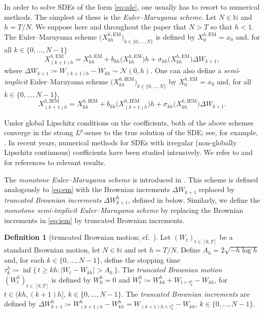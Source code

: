 \documentclass[onseside, final]{amsart}
\theoremstyle{definition}
\newtheorem{definition}[theorem]{Definition}
\newcommand{\N}{\mathbb N}
\newcommand{\EM}{\mathrm{EM}}
\newcommand{\IEM}{\mathrm{IEM}}
\numberwithin{equation}{section}
\begin{document}
			In order to solve SDEs of the form \eqref{eq:sde}, one usually has to resort to numerical methods. The simplest of these is the \emph{Euler--Maruyama scheme}. Let $N \in \N$ and $h = T/N$. We suppose here and throughout the paper that $N > T$ so that $h < 1$. The Euler--Maruyama scheme $\bigl(X^{h, \EM}_{kh}\bigr)_{k \in \{0, \dotsc, N\}}$ is defined by $X^{h, \EM}_0 = x_0$ and, for all $k \in \{0, \dotsc, N - 1\}$
		   \begin{equation}\label{eq:em}
		           X^{h,\EM}_{(k+1)h} = X^{h,\EM}_{kh} + b_{kh}\bigl(X^{h,\EM}_{kh}\bigr) h + \sigma_{kh}\bigl(X^{h,\EM}_{kh}\bigr)\Delta W_{k + 1},
		   \end{equation}
		   where $\Delta W_{k + 1} \coloneqq W_{(k + 1)h} - W_{kh} \sim \mathcal{N}(0,h)$. One can also define a \emph{semi-implicit} Euler--Maruyama scheme $\bigl(X^{h, \IEM}_{kh}\bigr)_{k \in \{0, \dotsc, N\}}$ by $X^{h, \EM}_0 = x_0$ and, for all $k \in \{0, \dotsc, N - 1\}$,
		  \begin{equation}\label{eq:iem}
		           X^{h,\IEM}_{(k+1)h} = X^{h,\IEM}_{kh} + b_{kh}\bigl(X^{h,\IEM}_{(k+1)h}\bigr) h + \sigma_{kh}\bigl(X^{h,\IEM}_{kh}\bigr)\Delta W_{k + 1}.
		   \end{equation}
		   
		   Under global Lipschitz conditions on the coefficients, both of the above schemes converge in the strong $L^p$-sense to the true solution of the SDE; see, for example, \citet{KlPl92}.
		   In recent years, numerical methods for SDEs with irregular (non-globally Lipschitz continuous) coefficients have been studied intensively. We refer to  and  for references to relevant results.
		
			The \emph{monotone Euler--Maruyama scheme} is introduced in \citep[Definition 3.13]{BaKaRo22}. This scheme is defined analogously to \eqref{eq:em} with the Brownian increments $\Delta W_{k + 1}$ replaced by \emph{truncated Brownian increments} $\Delta W^h_{k + 1}$, defined in  below. Similarly, we define the \emph{monotone semi-implicit Euler--Maruyama scheme} by replacing the Brownian increments in \eqref{eq:iem} by truncated Brownian increments.
		
			\begin{definition}[{truncated Brownian motion; cf.~\cite[\S 2.1]{MiReTr02}}]\label{def:trunc-bm}
				Let $(W_t)_{t \in [0, T]}$ be a standard Brownian motion, let $N \in \N$ and set $h = T/N$. Define $A_h = 2 \sqrt{- h \log h}$ and, for each $k \in \{0, \dotsc, N - 1\}$, define the stopping time $\tau^h_k \coloneqq \inf\{\, t \geq kh :  |W_t - W_{kh}| > A_h \,\}$. The \emph{truncated Brownian motion} $(W^h_t)_{t \in [0, T]}$ is defined by $W^h_0 = 0$ and $W^h_t \coloneqq W^h_{kh} + W_{t \wedge \tau^h_k} - W_{kh}$, for $t \in (kh, (k+1)h]$, $k \in \{0, \dotsc, N - 1\}$. The \emph{truncated Brownian increments} are defined by $\Delta W^h_{k + 1} \coloneqq W^h_{(k + 1)h} - W^h_{kh} = W_{(k+1)h \wedge \tau^h_k} - W_{kh}$, $k \in \{0, \dotsc, N - 1\}$.
			\end{definition}
			
\end{document}

